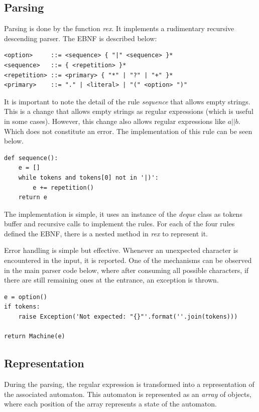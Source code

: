 \documentclass{llncs}
\begin{document}
\subsection{Parsing}

Parsing is done by the function \emph {rex}. It implements a rudimentary recursive descending parser. The EBNF is described below:


\begin{verbatim}
<option>     ::= <sequence> { "|" <sequence> }*
<sequence>   ::= { <repetition> }*
<repetition> ::= <primary> { "*" | "?" | "+" }*
<primary>    ::= "." | <literal> | "(" <option> ")"
\end{verbatim}

It is important to note the detail of the rule \emph {sequence} that allows empty strings. This is a change that allows empty strings as regular expressions (which is useful in some cases). However, this change also allows regular expressions like $a||b$. Which does not constitute an error. The implementation of this rule can be seen below. 

\begin{verbatim}
def sequence():
    e = []
    while tokens and tokens[0] not in '|)':
        e += repetition()
    return e
\end{verbatim}

The implementation is simple, it uses an instance of the  \emph{deque} class as tokens buffer and recursive calls to implement the rules. For each of the four rules defined the EBNF, there is a nested method in \emph {rex} to represent it. 

Error handling is simple but effective. Whenever an unexpected character is encountered in the input, it is reported. One of the mechanisms can be observed in the main parser code below, where after consuming all possible characters, if there are still remaining ones at the entrance, an exception is thrown.

\begin{verbatim}
e = option()
if tokens: 
    raise Exception('Not expected: "{}"'.format(''.join(tokens)))

return Machine(e)
\end{verbatim}

\subsection{Representation}

During the parsing, the regular expression is transformed into a representation of the associated automaton. This automaton is represented as an \emph {array} of objects, where each position of the array represents a state of the automaton. 
\end{document}
